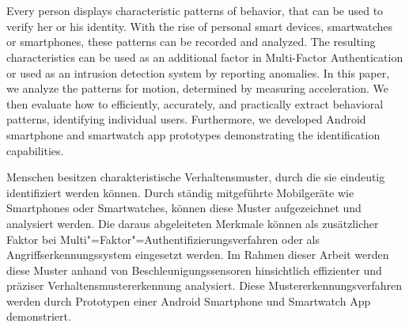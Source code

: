 \chapter{\abstractname}
Every person displays characteristic patterns of behavior, that can be used to verify her or his identity. With the rise of personal smart devices, \eg smartwatches or smartphones, these patterns can be recorded and analyzed. The resulting characteristics can be used as an additional factor in Multi-Factor Authentication or used as an intrusion detection system by reporting anomalies.
In this paper, we analyze the patterns for motion, determined by measuring acceleration. We then evaluate how to efficiently, accurately, and practically extract behavioral patterns, identifying individual users. Furthermore, we developed Android smartphone and smartwatch app prototypes demonstrating the identification capabilities.

\vspace{3cm}
\noindent
Menschen besitzen charakteristische Verhaltensmuster, durch die sie eindeutig identifiziert werden können. Durch ständig mitgeführte Mobilgeräte wie Smartphones oder Smartwatches, können diese Muster aufgezeichnet und analysiert werden. Die daraus abgeleiteten Merkmale können als zusätzlicher Faktor bei Multi"=Faktor"=Authentifizierungsverfahren oder als Angriffserkennungssystem eingesetzt werden.
Im Rahmen dieser Arbeit werden diese Muster anhand von Beschleunigungssensoren hinsichtlich effizienter und präziser Verhaltensmustererkennung analysiert. Diese Mustererkennungsverfahren werden durch Prototypen einer Android Smartphone und Smartwatch App demonstriert.
